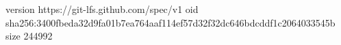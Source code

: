 version https://git-lfs.github.com/spec/v1
oid sha256:3400fbeda32d9fa01b7ea764aaf114ef57d32f32dc646bdcddf1c2064033545b
size 244992
